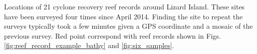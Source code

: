 \label{fig:sitemap} Locations of 21 cyclone recovery reef records around Lizard Island. These sites have been surveyed four times since April 2014. Finding the site to repeat the surveys typically took a few minutes given a GPS coordinate and a mosaic of the previous survey. Red point correspond with reef records shown in Figs. \ref{fig:reef_record_example_bathy} and \ref{fig:six_samples}.